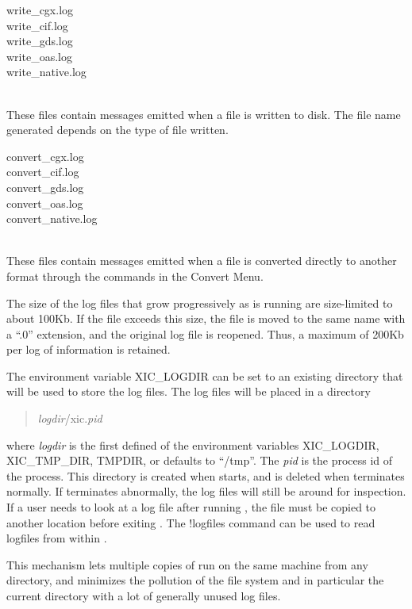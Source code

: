 \begin{description}
\item\parbox[b]{4in}{\vt
write\_cgx.log\\
write\_cif.log\\
write\_gds.log\\
write\_oas.log\\
write\_native.log}\\
These files contain messages emitted when a file is written to disk.
The file name generated depends on the type of file written.

\item\parbox[b]{4in}{\vt
convert\_cgx.log\\
convert\_cif.log\\
convert\_gds.log\\
convert\_oas.log\\
convert\_native.log}\\
These files contain messages emitted when a file is converted directly
to another format through the commands in the {\cb Convert Menu}.
\end{description}

The size of the log files that grow progressively as {\Xic} is running
are size-limited to about 100Kb.  If the file exceeds this size, the
file is moved to the same name with a ``{\vt .0}'' extension, and the
original log file is reopened.  Thus, a maximum of 200Kb per log of
information is retained.

The environment variable {\et XIC\_LOGDIR} can be set to an existing
directory that will be used to store the log files.  The log files
will be placed in a directory
\begin{quote}
{\it logdir}/{\vt xic}.{\it pid}
\end{quote}
where {\it logdir} is the first defined of the environment variables
{\et XIC\_LOGDIR}, {\et XIC\_TMP\_DIR}, {\et TMPDIR}, or defaults to
``{\et /tmp}''.  The {\it pid} is the process id of the {\Xic}
process.  This directory is created when {\Xic} starts, and is deleted
when {\Xic} terminates normally.  If {\Xic} terminates abnormally, the
log files will still be around for inspection.  If a user needs to
look at a log file after running {\Xic}, the file must be copied to
another location before exiting {\Xic}.  The {\cb !logfiles} command
can be used to read logfiles from within {\Xic}.

This mechanism lets multiple copies of {\Xic} run on the same machine
from any directory, and minimizes the pollution of the file system and
in particular the current directory with a lot of generally unused log
files.

